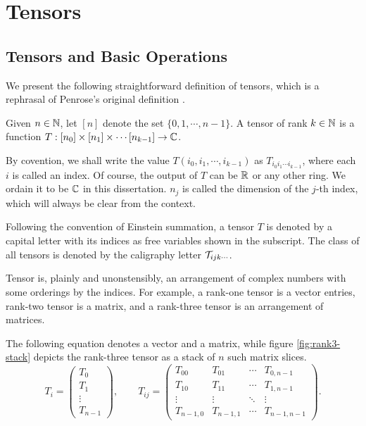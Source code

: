 \chapter{Tensors} \label{ch:tensors}

\section{Tensors and Basic Operations}

We present the following straightforward definition of tensors, which is a rephrasal of Penrose's original definition \cite{penrose1971applications}.

\begin{definition}\label{def:tensor}
Given $n\in \mathbb{N}$, let $[n]$ denote the set $\{0, 1, \cdots, n-1\}$. 
A tensor of rank $k \in \mathbb{N}$ is a function $T : [n_0] \times [n_1] \times \cdots [n_{k-1}] \rightarrow \mathbb{C}$.
\end{definition}

By covention, we shall write the value $T(i_0, i_1, \cdots, i_{k-1})$ as $T_{i_0 i_1 \cdots i_{k-1}}$, where each $i$ is called an index.
Of course, the output of $T$ can be $\mathbb{R}$ or any other ring. 
We ordain it to be $\mathbb{C}$ in this dissertation.
$n_j$ is called the dimension of the $j$-th index, which will always be clear from the context.

Following the convention of Einstein summation, a tensor $T$ is denoted by a capital letter with its indices as free variables shown in the subscript.
The class of all tensors is denoted by the caligraphy letter $\mathcal{T}_{ijk \cdots}$.

Tensor is, plainly and unonstensibly, an arrangement of complex numbers with some orderings by the indices.
For example, a rank-one tensor is a vector entries, rank-two tensor is a matrix, and a rank-three tensor is an arrangement of matrices.

The following equation denotes a vector and a matrix, while figure \ref{fig:rank3-stack} depicts the rank-three tensor as a stack of $n$ such matrix slices.
\begin{equation*}
	T_i =
	\begin{pmatrix}
		T_0 \\ T_1 \\ \vdots \\ T_{n-1}
	\end{pmatrix},
	\qquad
	T_{ij} =
	\begin{pmatrix}
		T_{00} & T_{01} & \cdots & T_{0,n-1} \\
		T_{10} & T_{11} & \cdots & T_{1,n-1} \\
		\vdots & \vdots & \ddots & \vdots \\
		T_{n-1,0} & T_{n-1,1} & \cdots & T_{n-1,n-1}
	\end{pmatrix}.
\end{equation*}

